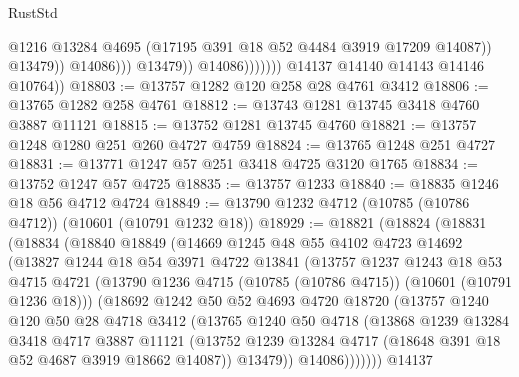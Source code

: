 \begin{lexlean}{RustStd}
\begin{coremodule}
                                      @1216
                                      @13284
                                      @4695
                                      (@17195 @391 @18 @52 @4484 @3919 @17209 @14087))
                                    @13479))
                                @14086)))
                          @13479))
                      @14086)))))))
        @14137
        @14140
        @14143
        @14146
        @10764))
@18803 := @13757 @1282 @120 @258 @28 @4761 @3412
@18806 := @13765 @1282 @258 @4761
@18812 := @13743 @1281 @13745 @3418 @4760 @3887 @11121
@18815 := @13752 @1281 @13745 @4760
@18821 := @13757 @1248 @1280 @251 @260 @4727 @4759
@18824 := @13765 @1248 @251 @4727
@18831 := @13771 @1247 @57 @251 @3418 @4725 @3120 @1765
@18834 := @13752 @1247 @57 @4725
@18835 := @13757 @1233
@18840 := @18835 @1246 @18 @56 @4712 @4724
@18849 := @13790 @1232 @4712 (@10785 (@10786 @4712)) (@10601 (@10791 @1232 @18))
@18929 := @18821
    (@18824
      (@18831
        (@18834
          (@18840
            @18849
            (@14669
              @1245
              @48
              @55
              @4102
              @4723
              @14692
              (@13827
                @1244
                @18
                @54
                @3971
                @4722
                @13841
                (@13757
                  @1237
                  @1243
                  @18
                  @53
                  @4715
                  @4721
                  (@13790 @1236 @4715 (@10785 (@10786 @4715)) (@10601 (@10791 @1236 @18)))
                  (@18692
                    @1242
                    @50
                    @52
                    @4693
                    @4720
                    @18720
                    (@13757
                      @1240
                      @120
                      @50
                      @28
                      @4718
                      @3412
                      (@13765
                        @1240
                        @50
                        @4718
                        (@13868
                          @1239
                          @13284
                          @3418
                          @4717
                          @3887
                          @11121
                          (@13752
                            @1239
                            @13284
                            @4717
                            (@18648 @391 @18 @52 @4687 @3919 @18662 @14087))
                          @13479))
                      @14086)))))))
        @14137

\end{coremodule}
\end{lexlean}
